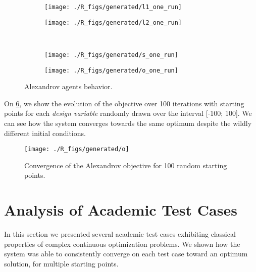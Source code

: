 \begin{figure}
\centering
	\begin{subfigure}[b]{0.4\textwidth}
		\centering
		\texttt{[image: ./R\_figs/generated/l1\_one\_run]}
		\label{alexandrov_res_one:l1}
	\end{subfigure}
	\begin{subfigure}[b]{0.4\textwidth}
		\centering
		\texttt{[image: ./R\_figs/generated/l2\_one\_run]}
		\label{alexandrov_res_one:l2}
	\end{subfigure}
	\vspace{-20pt}
	\\
	\begin{subfigure}[b]{0.4\textwidth}
		\centering
		\texttt{[image: ./R\_figs/generated/s\_one\_run]}
		\label{alexandrov_res_one:s}
	\end{subfigure}
	\begin{subfigure}[b]{0.4\textwidth}
		\centering
		\texttt{[image: ./R\_figs/generated/o\_one\_run]}
		\label{alexandrov_res_one:o}
	\end{subfigure}
	
	\caption{Alexandrov agents behavior.}
	\label{alexandrov_res_one}

\end{figure}

On \figurename{} \ref{alexandrov_res}, we show the evolution of the objective over 100 iterations with starting points for each \emph{design variable} randomly drawn over the interval [-100; 100]. We can see how the system converges towards the same optimum despite the wildly different initial conditions.

\begin{figure}
\centering
	\texttt{[image: ./R\_figs/generated/o]}
	\caption{Convergence of the Alexandrov objective for 100 random starting points.}
	\label{alexandrov_res}
\end{figure}

\section{Analysis of Academic Test Cases}

In this section we presented several academic test cases exhibiting classical properties of complex continuous optimization problems. We shown how the system was able to consistently converge on each test case toward an optimum solution, for multiple starting points.

